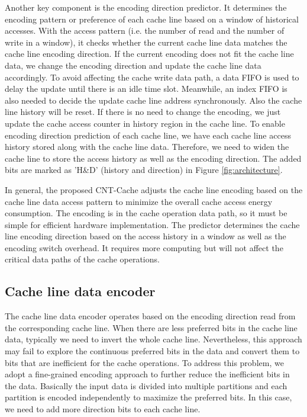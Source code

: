 Another key component is the encoding direction predictor. 
It determines the encoding pattern or preference of each cache line based on 
a window of historical accesses. With the access pattern (i.e. the number of read 
and the number of write in a window), it checks whether the current cache 
line data matches the cache line encoding direction.
If the current encoding does not fit the cache line data, we
change the encoding direction and update the cache line data accordingly.
To avoid affecting the cache write data path, a data FIFO is used to delay the update
until there is an idle time slot. Meanwhile, an index FIFO is also needed to 
decide the update cache line address synchronously. Also the cache line history 
will be reset. If there is no need to change the encoding,
we just update the cache access counter in history region in the cache line.
To enable encoding direction prediction of each cache line, we have each 
cache line access history stored along with the cache line data. Therefore, we need to 
widen the cache line to store the access history as well 
as the encoding direction. The added bits are marked as 'H\&D' (history and direction) in Figure \ref{fig:architecture}.

In general, the proposed CNT-Cache adjusts the cache line encoding 
based on the cache line data access pattern to minimize the overall 
cache access energy consumption. The encoding is in the cache 
operation data path, so it must be simple for efficient 
hardware implementation. The predictor determines the cache line 
encoding direction based on the access history in a window as 
well as the encoding switch overhead. It requires more computing 
but will not affect the critical data paths of the cache operations. 

\subsection{Cache line data encoder}
The cache line data encoder operates based on the encoding direction 
read from the corresponding cache line. When there are less 
preferred bits in the cache line data, typically we need to invert 
the whole cache line. Nevertheless,
this approach may fail to explore the continuous preferred bits 
in the data and convert them to bits that are inefficient for 
the cache operations. To address this problem, we adopt a fine-grained 
encoding approach to further reduce the inefficient bits in the data. 
Basically the input data is divided into multiple partitions and 
each partition is encoded independently to maximize the preferred bits.
In this case, %
we need to add more direction bits to each cache line.

